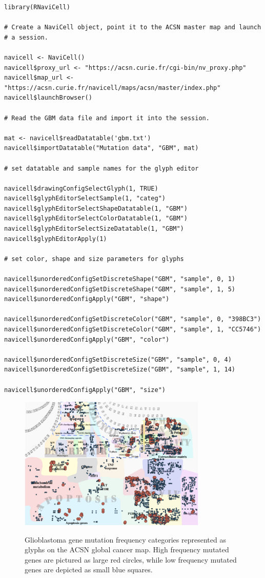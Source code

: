 \documentclass[article]{jss}
\begin{document}
\begin{verbatim}
library(RNaviCell)

# Create a NaviCell object, point it to the ACSN master map and launch
# a session.

navicell <- NaviCell()
navicell$proxy_url <- "https://acsn.curie.fr/cgi-bin/nv_proxy.php"
navicell$map_url <- "https://acsn.curie.fr/navicell/maps/acsn/master/index.php"
navicell$launchBrowser()

# Read the GBM data file and import it into the session.

mat <- navicell$readDatatable('gbm.txt')
navicell$importDatatable("Mutation data", "GBM", mat)

# set datatable and sample names for the glyph editor

navicell$drawingConfigSelectGlyph(1, TRUE)
navicell$glyphEditorSelectSample(1, "categ")
navicell$glyphEditorSelectShapeDatatable(1, "GBM")
navicell$glyphEditorSelectColorDatatable(1, "GBM")
navicell$glyphEditorSelectSizeDatatable(1, "GBM")
navicell$glyphEditorApply(1)

# set color, shape and size parameters for glyphs

navicell$unorderedConfigSetDiscreteShape("GBM", "sample", 0, 1)
navicell$unorderedConfigSetDiscreteShape("GBM", "sample", 1, 5)
navicell$unorderedConfigApply("GBM", "shape")

navicell$unorderedConfigSetDiscreteColor("GBM", "sample", 0, "398BC3")
navicell$unorderedConfigSetDiscreteColor("GBM", "sample", 1, "CC5746")
navicell$unorderedConfigApply("GBM", "color")

navicell$unorderedConfigSetDiscreteSize("GBM", "sample", 0, 4)
navicell$unorderedConfigSetDiscreteSize("GBM", "sample", 1, 14)

navicell$unorderedConfigApply("GBM", "size")
\end{verbatim}


\begin{figure}[!ht]
  \caption{Glioblastoma gene mutation frequency categories represented as
  glyphs on the ACSN global cancer map. High frequency mutated genes are
  pictured as large red circles, while low frequency mutated genes are depicted
  as small blue squares.
  } 
  \centering
  \includegraphics[width=0.8\textwidth]{figures/gbm.pdf}
  \label{fig:gbm}
\end{figure}
\end{document}
